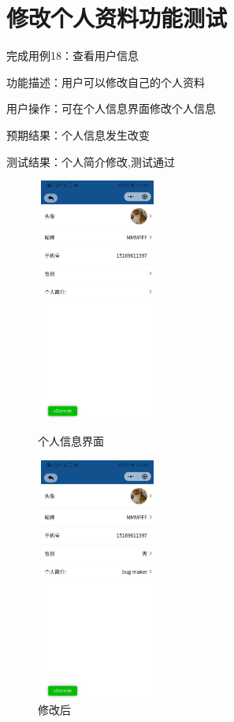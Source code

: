    \section{修改个人资料功能测试}
   完成用例18：查看用户信息

   功能描述：用户可以修改自己的个人资料
   
   用户操作：可在个人信息界面修改个人信息
   
   预期结果：个人信息发生改变
   
   测试结果：个人简介修改,测试通过
   
   \begin{figure}[htbp]
       \centering
       \begin{minipage}[t]{0.48\textwidth}
       \centering
       \includegraphics[width=4cm,height=8cm]{test/image/test53.png} 
      \caption{个人信息界面} 
       \end{minipage}
       \begin{minipage}[t]{0.48\textwidth}
        \centering
        \includegraphics[width=4cm,height=8cm]{test/image/test55.png} 
       \caption{修改后} 
        \end{minipage}
       \end{figure}
      \newpage 

